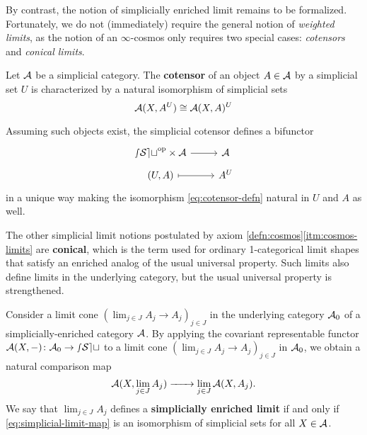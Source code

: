 By contrast, the notion of simplicially enriched limit remains to be formalized. Fortunately, we do not (immediately) require the general notion of \emph{weighted limits}, as the notion of an $\infty$-cosmos only requires two special cases: \emph{cotensors} and \emph{conical limits}.

\begin{defn}\label{defn:simplicial-cotensor}
  Let ${\mathord{\mathcal{A}}}$ be a simplicial category. The \textbf{cotensor} of an object $A \in {\mathord{\mathcal{A}}}$ by a simplicial set $U$ is characterized by a natural isomorphism of simplicial sets
  \begin{equation}\label{eq:cotensor-defn}
   {\mathord{\mathcal{A}}}(X,A^U) \cong {\mathord{\mathcal{A}}}(X,A)^U
   \end{equation}
\end{defn}

\begin{lem}\label{lem:cotensor-bifunctor}
  Assuming such objects exist, the simplicial cotensor defines a bifunctor
  \[
  \begin{tikzcd}[row sep=tiny] \sSet\op \times \cA \arrow[r] & \cA \\
  (U,A) \arrow[r, maps to] & A^U
  \end{tikzcd}\] in a unique way making the isomorphism \eqref{eq:cotensor-defn} natural in $U$ and $A$ as well.
\end{lem}

The other simplicial limit notions postulated by axiom \ref{defn:cosmos}\ref{itm:cosmos-limits} are \textbf{conical}, which is the term used for ordinary 1-categorical limit shapes that satisfy an enriched analog of the usual universal property.   Such limits also define limits in the underlying category, but the usual universal property is strengthened.

\begin{defn}\label{defn:simplicial-conical-limit}
  Consider a limit cone $(\lim_{j \in J}A_j \to A_j)_{j \in J}$ in the underlying category ${\mathord{\mathcal{A}}}_0$ of a simplicially-enriched category ${\mathord{\mathcal{A}}}$.  By applying the covariant rep\-re\-sentable functor ${\mathord{\mathcal{A}}}(X,-) \colon {\mathord{\mathcal{A}}}_0 \to {\mathord{\mathcal{sSet}}}$ to a limit cone $(\lim_{j \in J}A_j \to A_j)_{j \in J}$ in ${\mathord{\mathcal{A}}}_0$, we obtain a natural comparison map
  \begin{equation}\label{eq:simplicial-limit-map} {\mathord{\mathcal{A}}}(X,\lim_{j \in J}A_j) \xrightarrow{\mkern40mu} \lim_{j \in J}{\mathord{\mathcal{A}}}(X,A_j).
  \end{equation}
  We say that $\lim_{j\in J}A_j$ defines a \textbf{simplicially enriched limit} if and only if \eqref{eq:simplicial-limit-map} is an isomorphism of simplicial sets for all $X \in {\mathord{\mathcal{A}}}$.
\end{defn}

